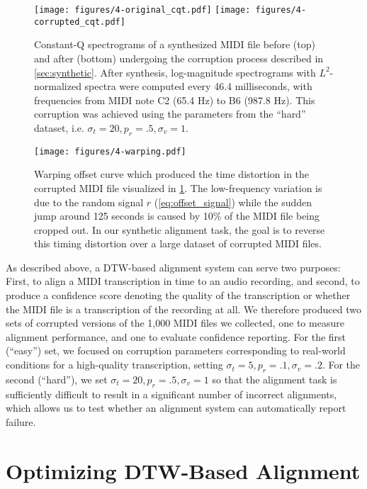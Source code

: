 \begin{figure}
  \centering
  \texttt{[image: figures/4-original\_cqt.pdf]}
  \texttt{[image: figures/4-corrupted\_cqt.pdf]}
  \caption[Constant-Q spectrograms of a MIDI file before and after corruption]{Constant-Q spectrograms of a synthesized MIDI file before (top) and after (bottom) undergoing the corruption process described in \cref{sec:synthetic}.
After synthesis, log-magnitude spectrograms with $L^2$-normalized spectra were computed every 46.4 milliseconds, with frequencies from MIDI note C2 (65.4 Hz) to B6 (987.8 Hz).
This corruption was achieved using the parameters from the ``hard'' dataset, i.e. $\sigma_t = 20, p_r = .5, \sigma_v = 1$.}
  \label{fig:corruption}
\end{figure}

\begin{figure}
  \centering
  \texttt{[image: figures/4-warping.pdf]}
  \caption[Example synthetic warping offset]{Warping offset curve which produced the time distortion in the corrupted MIDI file visualized in \cref{fig:corruption}.
The low-frequency variation is due to the random signal $r$ (\cref{eq:offset_signal}) while the sudden jump around 125 seconds is caused by 10\% of the MIDI file being cropped out.
In our synthetic alignment task, the goal is to reverse this timing distortion over a large dataset of corrupted MIDI files.}
  \label{fig:warping}
\end{figure}

As described above, a DTW-based alignment system can serve two purposes: First, to align a MIDI transcription in time to an audio recording, and second, to produce a confidence score denoting the quality of the transcription or whether the MIDI file is a transcription of the recording at all.
We therefore produced two sets of corrupted versions of the 1,000 MIDI files we collected, one to measure alignment performance, and one to evaluate confidence reporting.
For the first (``easy'') set, we focused on corruption parameters corresponding to real-world conditions for a high-quality transcription, setting $\sigma_t = 5, p_r = .1, \sigma_v = .2$.
For the second (``hard''), we set $\sigma_t = 20, p_r = .5, \sigma_v = 1$ so that the alignment task is sufficiently difficult to result in a significant number of incorrect alignments, which allows us to test whether an alignment system can automatically report failure.

\section{Optimizing DTW-Based Alignment}
\label{sec:optimizing}


